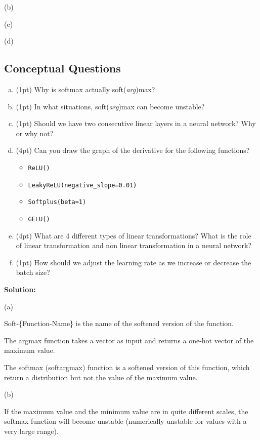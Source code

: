 (b)

(c)

(d)

\subsection{Conceptual Questions}

\begin{enumerate}[(a)]
    \item (1pt) Why is softmax actually soft(\textit{arg})max?
    \item (1pt) In what situations, soft(\textit{arg})max can become unstable?
    \item (1pt) Should we have two consecutive linear layers in a neural network? Why or why not? 
    
    \item (4pt) Can you draw the graph of the derivative for the following functions?
    \begin{itemize}
        \item \texttt{ReLU()}
        \item \texttt{LeakyReLU(negative\_slope=0.01)}
        \item \texttt{Softplus(beta=1)}
        \item \texttt{GELU()}
    \end{itemize}
    
    \item (4pt) What are 4 different types of linear transformations? What is the role of linear transformation and non linear transformation in a neural network?
    \item (1pt) How should we adjust the learning rate as we increase or decrease the batch size?
    
    
\end{enumerate}


\textbf{Solution:}

(a)

Soft-\{Function-Name\} is the name of the softened version of the function.

The argmax function takes a vector as input and returns a one-hot vector of the maximum value.

The softmax (softargmax) function is a softened version of this function, which return a distribution but not the value of the maximum value.


(b)

If the maximum value and the minimum value are in quite different scales, the softmax function will become unstable (numerically unstable for values with a very large range). 

